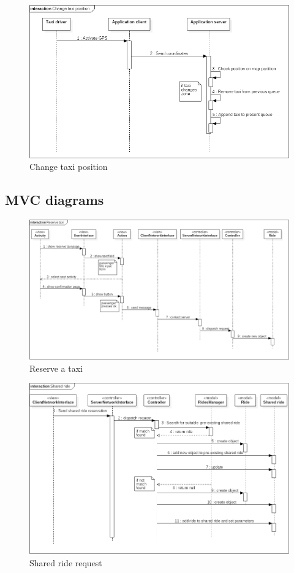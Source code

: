 \newpage
\begin{figure} [h]
\centering
\includegraphics[scale=0.5]{Sequence Diagrams/change_taxi_position.png}
\caption{Change taxi position }
\end{figure}
\newpage
	\subsection{MVC diagrams}
\begin{figure} [h]
\centering
\includegraphics[scale=0.5]{Sequence Diagrams/MVC_reserve_taxi.png}
\caption{Reserve a taxi }
\end{figure}
\newpage
\begin{figure} [h]
\centering
\includegraphics[scale=0.5]{Sequence Diagrams/MVC_Shared_ride.png}
\caption{Shared ride request }
\end{figure}
\newpage
\newpage
